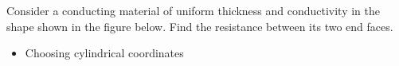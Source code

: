 
\begin{ELexample}{}

Consider a conducting material of uniform thickness  and conductivity \ELim{\sigma} in the shape shown in the figure below. Find the resistance between its two end faces.


\begin{ELsolution}

\begin{itemize}
\tightlist
\item
  Choosing cylindrical coordinates
\end{itemize}


\end{ELsolution}

\end{ELexample}
